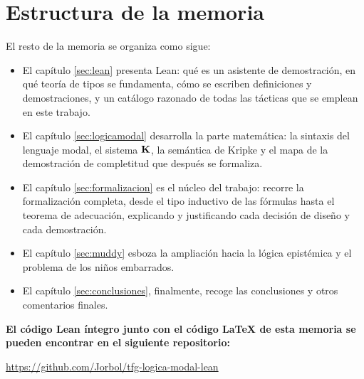 \section{Estructura de la memoria}

El resto de la memoria se organiza como sigue:

\begin{itemize}
      \item El capítulo \ref{sec:lean} presenta Lean: qué es un asistente de demostración, en qué teoría de tipos se fundamenta, cómo se escriben definiciones y demostraciones, y un catálogo razonado de todas las tácticas que se emplean en este trabajo.
      \item El capítulo \ref{sec:logicamodal} desarrolla la parte matemática: la sintaxis del lenguaje modal, el sistema $\mathbf{K}$, la semántica de Kripke y el mapa de la demostración de completitud que después se formaliza.
      \item El capítulo \ref{sec:formalizacion} es el núcleo del trabajo: recorre la formalización completa, desde el tipo inductivo de las fórmulas hasta el teorema de adecuación, explicando y justificando cada decisión de diseño y cada demostración.
      \item El capítulo \ref{sec:muddy} esboza la ampliación hacia la lógica epistémica y el problema de los niños embarrados.
      \item El capítulo \ref{sec:conclusiones}, finalmente, recoge las conclusiones y otros comentarios finales.
\end{itemize}

\noindent\textbf{El código Lean íntegro junto con el código \LaTeX{} de esta memoria se pueden encontrar en el siguiente repositorio:}

\noindent\url{https://github.com/Jorbol/tfg-logica-modal-lean}